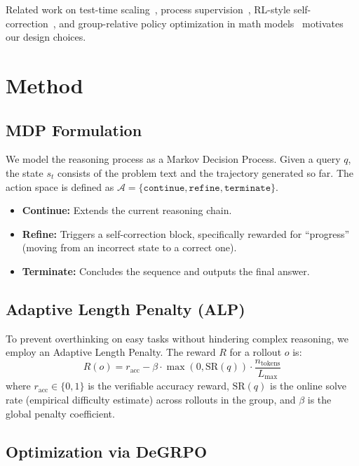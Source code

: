 \documentclass{article}
\begin{document}
Related work on test-time scaling~\citep{wei2022chainofthought,wang2023selfconsistency,snell2024scaling}, process supervision~\citep{lightman2023lets,zhang2025lessons}, RL-style self-correction~\citep{kumar2024score}, and group-relative policy optimization in math models~\citep{shao2024deepseekmath} motivates our design choices.

\section{Method}

\subsection{MDP Formulation}

We model the reasoning process as a Markov Decision Process.
Given a query $q$, the state $s_t$ consists of the problem text and the trajectory generated so far.
The action space is defined as $\mathcal{A} = \{\texttt{continue}, \texttt{refine}, \texttt{terminate}\}$.

\begin{itemize}
  \item \textbf{Continue:} Extends the current reasoning chain.
  \item \textbf{Refine:} Triggers a self-correction block, specifically rewarded for ``progress'' (moving from an incorrect state to a correct one).
  \item \textbf{Terminate:} Concludes the sequence and outputs the final answer.
\end{itemize}

\subsection{Adaptive Length Penalty (ALP)}

To prevent overthinking on easy tasks without hindering complex reasoning, we employ an Adaptive Length Penalty.
The reward $R$ for a rollout $o$ is:
\begin{equation}
  R(o) = r_{\text{acc}} - \beta \cdot \max(0, \text{SR}(q)) \cdot \frac{n_{\text{tokens}}}{L_{\text{max}}}
\end{equation}
where $r_{\text{acc}} \in \{0, 1\}$ is the verifiable accuracy reward, $\text{SR}(q)$ is the online solve rate (empirical difficulty estimate) across rollouts in the group, and $\beta$ is the global penalty coefficient.

\subsection{Optimization via DeGRPO}
\end{document}
